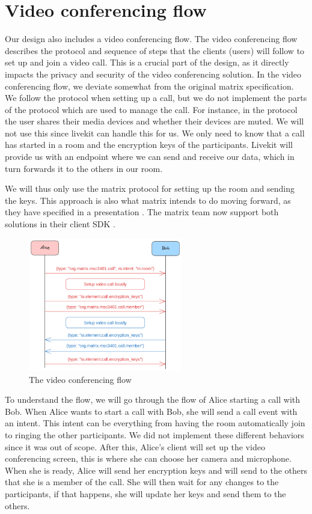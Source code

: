 \documentclass{report}
\begin{document}
\section{Video conferencing flow}
Our design also includes a video conferencing flow. The video conferencing flow describes the protocol and sequence
of steps that the clients (users) will follow to set up and join a video call.
This is a crucial part of the design, as it directly impacts the privacy and security of the video conferencing solution.
In the video conferencing flow, we deviate somewhat from the original matrix specification. We follow the protocol
when setting up a call, but we do not implement the parts of the protocol which are used to manage the call. For
instance, in the protocol the user shares their media devices and whether their devices are muted. We will not use
this since livekit can handle this for us. We only need to know that a call has started in a room and the encryption
keys of the participants. Livekit will provide us with an endpoint where we can send and receive our data, which in
turn forwards it to the others in our room.

We will thus only use the matrix protocol for setting up the room and sending the keys. This approach is also what
matrix intends to do moving forward, as they have specified in a presentation \cite{nirve_matrixrtc_nodate}. The
matrix team now support both solutions in their client SDK .

\begin{figure}
\centering
\includegraphics[width=0.6\textwidth]{img/Callflow.excalidraw.png}
\caption{The video conferencing flow}
\label{fig:video-conference-flow}
\end{figure}

To understand the flow, we will go through the flow of Alice starting a call with Bob.
When Alice wants to start a call with Bob, she will send a call event with an intent. This intent can be
everything from having the room automatically join to ringing the other participants. We did not implement
these different behaviors since it was out of scope. After this, Alice's client will set up the video conferencing
screen, this is where she can choose her camera and microphone. When she is ready, Alice will send her encryption
keys and will send to the others that she is a member of the call. She will then wait for any changes to the
participants, if that happens, she will update her keys and send them to the others.
\end{document}
